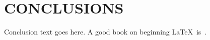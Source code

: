  \chapter{CONCLUSIONS}\label{chap:conclusions}
Conclusion text goes here.  A good book on beginning \LaTeX\ is~\cite{lamport:94}.